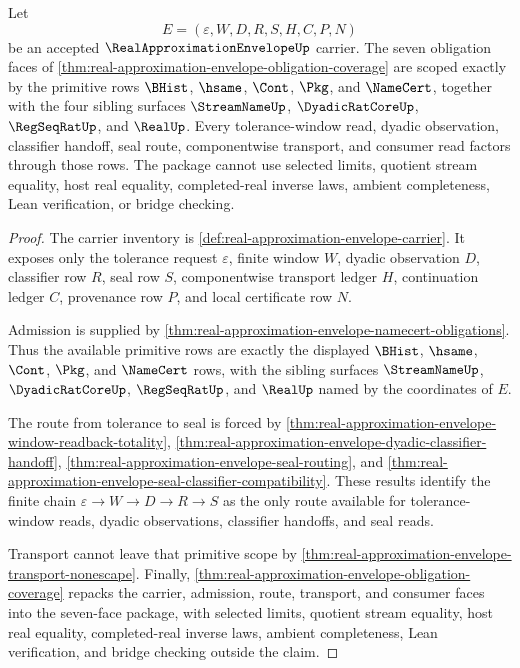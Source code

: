 \begin{theorem}
\label{thm:real-approximation-envelope-primitive-scope-closure}
Let
$$
E=(\varepsilon,W,D,R,S,H,C,P,N)
$$
be an accepted $\RealApproximationEnvelopeUp$ carrier. The seven obligation faces of \autoref{thm:real-approximation-envelope-obligation-coverage} are scoped exactly by the primitive rows $\BHist$, $\hsame$, $\Cont$, $\Pkg$, and $\NameCert$, together with the four sibling surfaces $\StreamNameUp$, $\DyadicRatCoreUp$, $\RegSeqRatUp$, and $\RealUp$. Every tolerance-window read, dyadic observation, classifier handoff, seal route, componentwise transport, and consumer read factors through those rows. The package cannot use selected limits, quotient stream equality, host real equality, completed-real inverse laws, ambient completeness, Lean verification, or bridge checking.
\end{theorem}
\begin{proof}
The carrier inventory is \autoref{def:real-approximation-envelope-carrier}. It exposes only the tolerance request $\varepsilon$, finite window $W$, dyadic observation $D$, classifier row $R$, seal row $S$, componentwise transport ledger $H$, continuation ledger $C$, provenance row $P$, and local certificate row $N$.

Admission is supplied by \autoref{thm:real-approximation-envelope-namecert-obligations}. Thus the available primitive rows are exactly the displayed $\BHist$, $\hsame$, $\Cont$, $\Pkg$, and $\NameCert$ rows, with the sibling surfaces $\StreamNameUp$, $\DyadicRatCoreUp$, $\RegSeqRatUp$, and $\RealUp$ named by the coordinates of $E$.

The route from tolerance to seal is forced by \autoref{thm:real-approximation-envelope-window-readback-totality}, \autoref{thm:real-approximation-envelope-dyadic-classifier-handoff}, \autoref{thm:real-approximation-envelope-seal-routing}, and \autoref{thm:real-approximation-envelope-seal-classifier-compatibility}. These results identify the finite chain $\varepsilon \to W \to D \to R \to S$ as the only route available for tolerance-window reads, dyadic observations, classifier handoffs, and seal reads.

Transport cannot leave that primitive scope by \autoref{thm:real-approximation-envelope-transport-nonescape}. Finally, \autoref{thm:real-approximation-envelope-obligation-coverage} repacks the carrier, admission, route, transport, and consumer faces into the seven-face package, with selected limits, quotient stream equality, host real equality, completed-real inverse laws, ambient completeness, Lean verification, and bridge checking outside the claim.
\end{proof}

